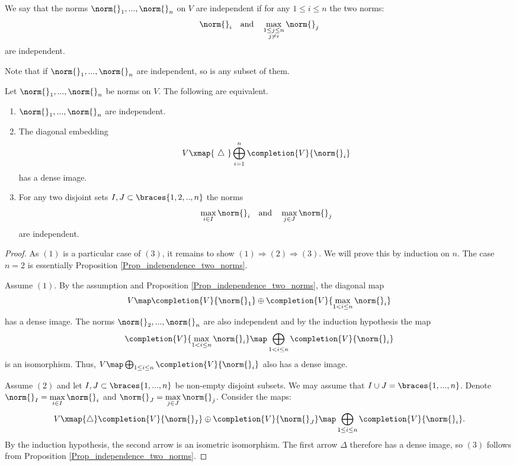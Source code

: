 \begin{defn}
We say that the norms $\norm{}_1,...,\norm{}_n$ on $V$ are independent if for any $1\leq i\leq n$ the two norms:
\[\norm{}_i \ \ \ \text{and}\ \ \   \max_{\substack{1\leq j\leq n \\ j\neq i}}\norm{}_j\]
are independent.
\end{defn} 

Note that if $\norm{}_1,...,\norm{}_n$ are independent, so is any subset of them.

\begin{prop}\label{prop_independence_general}
Let $\norm{}_1,...,\norm{}_n$ be norms on $V$.
The following are equivalent.
    \begin{enumerate}
    \item $\norm{}_1,...,\norm{}_n$ are independent.
    \item The diagonal embedding
    \[V\xmap{\ \triangle\ }\bigoplus_{i=1}^n\completion{V}{\norm{}_i}\]
    has a dense image.
    \item For any two disjoint sets $I,J\subset \braces{1,2,..,n}$ the norms 
    \[\max_{i\in I}\norm{}_i\ \ \ \text{and}\ \ \ \max_{j\in J}\norm{}_j\]
    are independent.
    \end{enumerate}
\end{prop} 
    \begin{proof}
    As $(1)$ is a particular case of $(3)$, it remains to show $(1)\Rightarrow(2)\Rightarrow(3)$.
    We will prove this by induction on $n$.
    The case $n=2$ is essentially Proposition \ref{Prop_independence_two_norms}.
    
    Assume $(1)$.
    By the assumption and Proposition \ref{Prop_independence_two_norms}, the diagonal map
    \[V\map \completion{V}{\norm{}_1}\oplus\completion{V}{\max_{1<i\leq n}\norm{}_i}\]
    has a dense image.
    The norms $\norm{}_2,...,\norm{}_n$ are also independent and by the induction hypothesis the map
    \[\completion{V}{\max_{1<i\leq n}\norm{}_i}\map \bigoplus_{1<i\leq n}\completion{V}{\norm{}_i}\]
    is an isomorphism.
    Thus, $V\map \bigoplus_{1\leq i\leq n}\completion{V}{\norm{}_i}$ also has a dense image.
    
    Assume $(2)$ and let $I,J\subset \braces{1,...,n}$ be non-empty disjoint subsets.
    We may assume that $I\cup J=\braces{1,...,n}$.
    Denote $\norm{}_I=\displaystyle\max_{i\in I}\norm{}_i$ and $\norm{}_J=\displaystyle\max_{j\in J}\norm{}_j$.
    Consider the maps:
    \[V\xmap{\triangle} \completion{V}{\norm{}_I}\oplus\completion{V}{\norm{}_J}\map \bigoplus_{1\leq i\leq n}\completion{V}{\norm{}_i}.\]
    By the induction hypothesis, the second arrow is an isometric isomorphism. The first arrow $\Delta$ therefore has a dense image, so $(3)$ follows from Proposition \ref{Prop_independence_two_norms}.
    \end{proof} 

